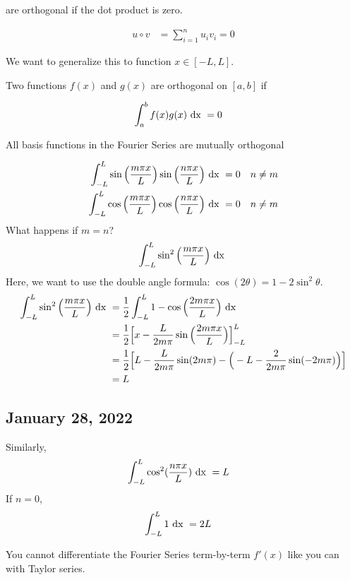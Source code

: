  are orthogonal if the dot product is zero.

  \begin{align}
    u \circ v & = \sum^n_{i = 1} u_i v_i = 0
  \end{align}

  We want to generalize this to function $x \in [-L, L]$.

  \dfn Two functions $f(x)$ and $g(x)$ are orthogonal on $[a, b]$ if

  \begin{align}
    \int^b_a f(x)g(x) \text{ dx } & = 0
  \end{align}

  \thm All basis functions in the Fourier Series are mutually orthogonal

  \begin{align}
    \int^L_{-L} \sin\Big(\frac{m \pi x}{L}\Big) \sin \Big( \frac{n \pi x}{L} \Big) \text{ dx } & = 0 \quad n \neq m\\
    \int^L_{-L} \cos\Big(\frac{m \pi x}{L}\Big) \cos \Big( \frac{n \pi x}{L} \Big) \text{ dx } & = 0 \quad n \neq m
  \end{align}
  What happens if $m = n$?
  \begin{align}
    \int^L_{-L} \sin^2\Big( \frac{m \pi x}{L} \Big) \text{ dx }
  \end{align}
  Here, we want to use the double angle formula: $\cos(2\theta) = 1 - 2\sin^2 \theta$.
  \begin{align}
    \int^L_{-L} \sin^2\Big( \frac{m \pi x}{L} \Big) \text{ dx } & =
    \frac{1}{2} \int^L_{-L} 1 - \cos\Big(\frac{2 m \pi x}{L}\Big) \text{ dx }\\ & =
    \frac{1}{2} \Big[ x - \frac{L}{2 m \pi}\sin\Big(\frac{2 m \pi x}{L}\Big)\Big]^L_{-L}\\ & =
    \frac{1}{2} \Big[L - \frac{L}{2 m \pi} \sin(2 m \pi) - \Big(-L - \frac{2}{2 m \pi} \sin(-2 m \pi)\Big)\Big]\\ & =
    L
  \end{align}

  \subsection*{January 28, 2022}
  Similarly,
  \begin{align}
    \int^L_{-L} \cos^2 (\frac{n\pi x}{L}) \text{ dx } & = L
  \end{align}
  If $n = 0$,
  \begin{align}
    \int^L_{-L} 1 \text{ dx } & = 2L
  \end{align}

  \note You cannot differentiate the Fourier Series term-by-term $f'(x)$ like you can with Taylor series.

